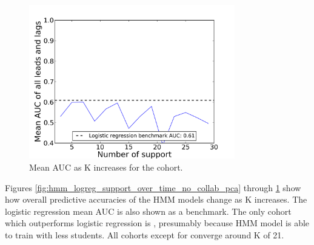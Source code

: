 \begin{figure}[ht!]
  \caption{Mean AUC as K increases for the \wiki cohort.}\label{fig:hmm_logreg_support_over_time_wiki_only}
  \centering
    \includegraphics[width=0.8\textwidth]{figures/hmm_logreg/wiki_only_support_over_time.png}
\end{figure}

Figures \ref{fig:hmm_logreg_support_over_time_no_collab_pca} through \ref{fig:hmm_logreg_support_over_time_wiki_only} show how overall predictive accuracies of the HMM models change as K increases. The logistic regression mean AUC is also shown as a benchmark. The only cohort which outperforms logistic regression is \both, presumably because HMM model is able to train with less students. All cohorts except for \wiki converge around K of 21.